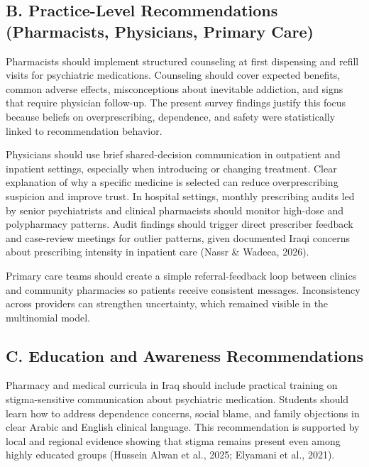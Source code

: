 \subsection{B. Practice-Level Recommendations (Pharmacists, Physicians,
Primary
Care)}\label{b.-practice-level-recommendations-pharmacists-physicians-primary-care}

Pharmacists should implement structured counseling at first dispensing
and refill visits for psychiatric medications. Counseling should cover
expected benefits, common adverse effects, misconceptions about
inevitable addiction, and signs that require physician follow-up. The
present survey findings justify this focus because beliefs on
overprescribing, dependence, and safety were statistically linked to
recommendation behavior.

Physicians should use brief shared-decision communication in outpatient
and inpatient settings, especially when introducing or changing
treatment. Clear explanation of why a specific medicine is selected can
reduce overprescribing suspicion and improve trust. In hospital
settings, monthly prescribing audits led by senior psychiatrists and
clinical pharmacists should monitor high-dose and polypharmacy patterns.
Audit findings should trigger direct prescriber feedback and case-review
meetings for outlier patterns, given documented Iraqi concerns about
prescribing intensity in inpatient care (Nassr \& Wadeea, 2026).

Primary care teams should create a simple referral-feedback loop between
clinics and community pharmacies so patients receive consistent
messages. Inconsistency across providers can strengthen uncertainty,
which remained visible in the multinomial model.

\subsection{C. Education and Awareness
Recommendations}\label{c.-education-and-awareness-recommendations}

Pharmacy and medical curricula in Iraq should include practical training
on stigma-sensitive communication about psychiatric medication. Students
should learn how to address dependence concerns, social blame, and
family objections in clear Arabic and English clinical language. This
recommendation is supported by local and regional evidence showing that
stigma remains present even among highly educated groups (Hussein Alwan
et al., 2025; Elyamani et al., 2021).

